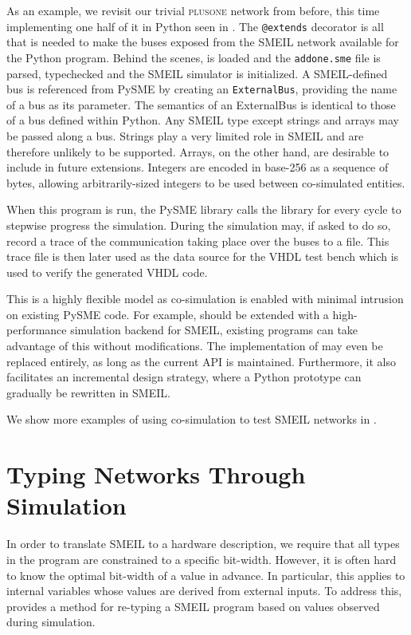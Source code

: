 As an example, we revisit our trivial \textsc{plusone} network from before, this
time implementing one half of it in Python seen in . The
\texttt{@extends} decorator is all that is needed to make the buses exposed from
the SMEIL network available for the Python program. Behind the scenes, \libsme{}
is loaded and the \texttt{addone.sme} file is parsed, typechecked and the
\libsme{} SMEIL simulator is initialized. A SMEIL-defined bus is referenced from
PySME by creating an \texttt{ExternalBus}, providing the name of a bus as its
parameter. The semantics of an {\ttfamily ExternalBus} is identical to those of
a bus defined within Python. Any SMEIL type except strings and arrays may be
passed along a bus. Strings play a very limited role in SMEIL and are therefore
unlikely to be supported. Arrays, on the other hand, are desirable to include in
future extensions. Integers are encoded in base-256 as a sequence of bytes,
allowing arbitrarily-sized integers to be used between co-simulated entities.

When this program is run, the PySME library calls the \libsme{} library for
every cycle to stepwise progress the simulation. During the simulation \libsme{}
may, if asked to do so, record a trace of the communication taking place over
the buses to a file. This trace file is then later used as the data source for
the VHDL test bench which is used to verify the generated VHDL code.

This is a highly flexible model as co-simulation is enabled with minimal
intrusion on existing PySME code. For example, should \libsme{} be extended with
a high-performance simulation backend for SMEIL, existing programs can take
advantage of this without modifications. The implementation of \libsme{} may
even be replaced entirely, as long as the current API is
maintained. Furthermore, it also facilitates an incremental design strategy,
where a Python prototype can gradually be rewritten in SMEIL.

We show more examples of using co-simulation to test SMEIL networks in
.



\section{Typing Networks Through Simulation}
\label{sec:typing}
  In order to translate SMEIL to a hardware
description, we require that all types in the program are constrained to a
specific bit-width. However, it is often hard to know the optimal bit-width of a
value in advance. In particular, this applies to internal variables whose values
are derived from external inputs. To address this, \libsme{} provides a method
for re-typing a SMEIL program based on values observed during simulation.

